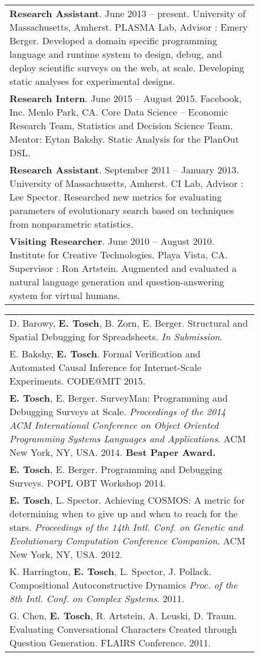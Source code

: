 \documentclass[10pt]{article}
\def \boxwidth {6in}
\newcommand{\cvsec}[2]{
	\begin{figure*}
		\begin{subfigure}[t]{1in}
			\sc{#1} 
		\end{subfigure}
		\begin{subfigure}[t]{6in}
		\vspace{-13px}
		    \begin{longtable}[t]{p{\boxwidth}}
                #2
            \end{longtable}
		\end{subfigure}
	\end{figure*}
}
\begin{document}
\cvsec{Research \newline Experience}{
		{\bf Research Assistant}. June 2013 -- present. University of Massachusetts, Amherst. PLASMA Lab, Advisor : Emery Berger. Developed a domain specific programming language and runtime system
to design, debug, and deploy scientific surveys on the web, at scale. Developing static analyses for experimental designs.\\

{\bf Research Intern}. June 2015 -- August 2015. Facebook, Inc. Menlo Park, CA. Core Data Science -- Economic Research Team, Statistics and Decision Science Team. Mentor: Eytan Bakshy. Static Analysis for the PlanOut DSL. \\

		{\bf Research Assistant}. September 2011 -- January 2013. University of Massachusetts, Amherst. CI Lab, Advisor : Lee Spector. Researched new metrics for evaluating parameters of evolutionary
search based on techniques from nonparametric statistics.\\

		{\bf Visiting Researcher}. June 2010 -- August 2010. Institute for Creative Technologies. Playa Vista, CA. Supervisor : Ron Artstein. Augmented and evaluated a natural language generation and
question-answering system for virtual humans.
}

\cvsec{Publications}{
		D. Barowy, {\bf E. Tosch}, B. Zorn, E. Berger. Structural and Spatial Debugging for Spreadsheets. \emph{In Submission}.\\
		
		E. Bakshy, {\bf E. Tosch}. Formal Verification and Automated Causal Inference for Internet-Scale Experiments. CODE@MIT 2015.\\
		
        {\bf E. Tosch}, E. Berger. SurveyMan: Programming and Debugging Surveys at Scale. \emph{Proceedings of the 2014 ACM International Conference on Object Oriented Programming Systems Languages and Applications}. ACM New York, NY, USA. 2014. {\bf Best Paper Award.}\\
        
        {\bf E. Tosch}, E. Berger. Programming and Debugging Surveys. POPL OBT Workshop 2014.\\
      
		{\bf E. Tosch}, L. Spector. Achieving COSMOS: A metric for determining when to give up and when to reach for the stars. \emph{Proceedings of the 14th Intl. Conf. on Genetic and Evolutionary Computation Conference Companion}. ACM New York, NY, USA. 2012.\\
	K. Harrington, {\bf E. Tosch}, L. Spector, J. Pollack. Compositional Autoconstructive Dynamics \emph{Proc. of the 8th Intl. Conf. on Complex Systems}. 2011.\\
	
	G. Chen, {\bf E. Tosch}, R. Artstein, A. Leuski, D. Traum. Evaluating Conversational Characters Created through Question Generation. FLAIRS Conference. 2011.
}
\end{document}

